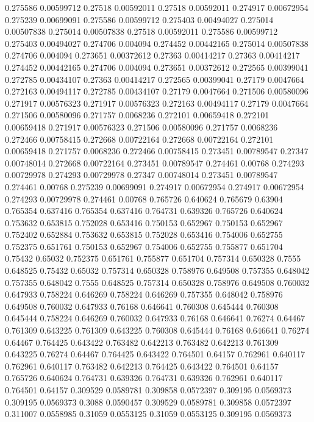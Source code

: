 0.275586 0.00599712
0.27518 0.00592011
0.27518 0.00592011
0.274917 0.00672954
0.275239 0.00699091
0.275586 0.00599712
0.275403 0.00494027
0.275014 0.00507838
0.275014 0.00507838
0.27518 0.00592011
0.275586 0.00599712
0.275403 0.00494027
0.274706 0.004094
0.274452 0.00442165
0.275014 0.00507838
0.274706 0.004094
0.273651 0.00372612
0.27363 0.00414217
0.27363 0.00414217
0.274452 0.00442165
0.274706 0.004094
0.273651 0.00372612
0.272565 0.00399041
0.272785 0.00434107
0.27363 0.00414217
0.272565 0.00399041
0.27179 0.0047664
0.272163 0.00494117
0.272785 0.00434107
0.27179 0.0047664
0.271506 0.00580096
0.271917 0.00576323
0.271917 0.00576323
0.272163 0.00494117
0.27179 0.0047664
0.271506 0.00580096
0.271757 0.0068236
0.272101 0.00659418
0.272101 0.00659418
0.271917 0.00576323
0.271506 0.00580096
0.271757 0.0068236
0.272466 0.00758415
0.272668 0.00722164
0.272668 0.00722164
0.272101 0.00659418
0.271757 0.0068236
0.272466 0.00758415
0.273451 0.00789547
0.27347 0.00748014
0.272668 0.00722164
0.273451 0.00789547
0.274461 0.00768
0.274293 0.00729978
0.274293 0.00729978
0.27347 0.00748014
0.273451 0.00789547
0.274461 0.00768
0.275239 0.00699091
0.274917 0.00672954
0.274917 0.00672954
0.274293 0.00729978
0.274461 0.00768
0.765726 0.640624
0.765679 0.63904
0.765354 0.637416
0.765354 0.637416
0.764731 0.639326
0.765726 0.640624
0.753632 0.653815
0.752028 0.653416
0.750153 0.652967
0.750153 0.652967
0.752402 0.652884
0.753632 0.653815
0.752028 0.653416
0.754006 0.652755
0.752375 0.651761
0.750153 0.652967
0.754006 0.652755
0.755877 0.651704
0.75432 0.65032
0.752375 0.651761
0.755877 0.651704
0.757314 0.650328
0.7555 0.648525
0.75432 0.65032
0.757314 0.650328
0.758976 0.649508
0.757355 0.648042
0.757355 0.648042
0.7555 0.648525
0.757314 0.650328
0.758976 0.649508
0.760032 0.647933
0.758224 0.646269
0.758224 0.646269
0.757355 0.648042
0.758976 0.649508
0.760032 0.647933
0.76168 0.646641
0.760308 0.645444
0.760308 0.645444
0.758224 0.646269
0.760032 0.647933
0.76168 0.646641
0.76274 0.64467
0.761309 0.643225
0.761309 0.643225
0.760308 0.645444
0.76168 0.646641
0.76274 0.64467
0.764425 0.643422
0.763482 0.642213
0.763482 0.642213
0.761309 0.643225
0.76274 0.64467
0.764425 0.643422
0.764501 0.64157
0.762961 0.640117
0.762961 0.640117
0.763482 0.642213
0.764425 0.643422
0.764501 0.64157
0.765726 0.640624
0.764731 0.639326
0.764731 0.639326
0.762961 0.640117
0.764501 0.64157
0.309529 0.0589781
0.309858 0.0572397
0.309195 0.0569373
0.309195 0.0569373
0.3088 0.0590457
0.309529 0.0589781
0.309858 0.0572397
0.311007 0.0558985
0.31059 0.0553125
0.31059 0.0553125
0.309195 0.0569373
